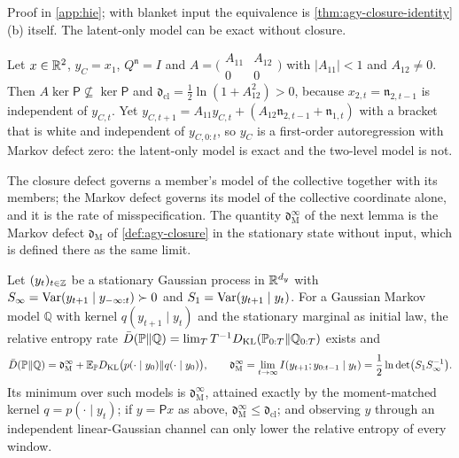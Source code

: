Proof in \cref{app:hie}; with blanket input the equivalence is \cref{thm:agy-closure-identity}(b) itself. The latent-only model can be exact without closure.

\begin{example}\label{ex:hie-markov-without-closure}
Let $x\in\mathbb{R}^2$, $y_C=x_1$, $Q^{\mathfrak n}=I$ and $A=\bigl(\begin{smallmatrix}A_{11}&A_{12}\\0&0\end{smallmatrix}\bigr)$ with $\lvert A_{11}\rvert<1$ and $A_{12}\neq0$. Then $A\ker\mathsf P\not\subseteq\ker\mathsf P$ and $\mathfrak d_{\mathrm{cl}}=\frac12\ln(1+A_{12}^2)>0$, because $x_{2,t}=\mathfrak n_{2,t-1}$ is independent of $y_{C,t}$. Yet $y_{C,t+1}=A_{11}y_{C,t}+(A_{12}\mathfrak n_{2,t-1}+\mathfrak n_{1,t})$ with a bracket that is white and independent of $y_{C,0:t}$, so $y_C$ is a first-order autoregression with Markov defect zero: the latent-only model is exact and the two-level model is not.
\end{example}

The closure defect governs a member's model of the collective together with its members; the Markov defect governs its model of the collective coordinate alone, and it is the rate of misspecification. The quantity $\mathfrak d^\infty_{\mathrm M}$ of the next lemma is the Markov defect $\mathfrak d_{\mathrm M}$ of \cref{def:agy-closure} in the stationary state without input, which is defined there as the same limit.

\begin{lemma}\label{lem:hie-misspecification}
Let $(y_t)_{t\in\mathbb{Z}}$ be a stationary Gaussian process in $\mathbb{R}^{d_y}$ with $S_\infty=\operatorname{Var}(y_{t+1}\mid y_{-\infty:t})\succ0$ and $S_1=\operatorname{Var}(y_{t+1}\mid y_t)$. For a Gaussian Markov model $\mathbb Q$ with kernel $q(y_{t+1}\mid y_t)$ and the stationary marginal as initial law, the relative entropy rate $\bar D(\mathbb P\Vert\mathbb Q)=\lim_TT^{-1}D_{\mathrm{KL}}(\mathbb P_{0:T}\Vert\mathbb Q_{0:T})$ exists and
\begin{equation}\label{eq:hie-rate}
\bar D(\mathbb P\Vert\mathbb Q)=\mathfrak d^\infty_{\mathrm M}+\mathbb{E}_{\mathbb P}D_{\mathrm{KL}}\bigl(p(\cdot\mid y_0)\Vert q(\cdot\mid y_0)\bigr),\qquad\mathfrak d^\infty_{\mathrm M}=\lim_{t\to\infty}I(y_{t+1};y_{0:t-1}\mid y_t)=\frac12\ln\det\bigl(S_1S_\infty^{-1}\bigr).
\end{equation}
Its minimum over such models is $\mathfrak d^\infty_{\mathrm M}$, attained exactly by the moment-matched kernel $q=p(\cdot\mid y_t)$; if $y=\mathsf Px$ as above, $\mathfrak d^\infty_{\mathrm M}\le\mathfrak d_{\mathrm{cl}}$; and observing $y$ through an independent linear-Gaussian channel can only lower the relative entropy of every window.
\end{lemma}

